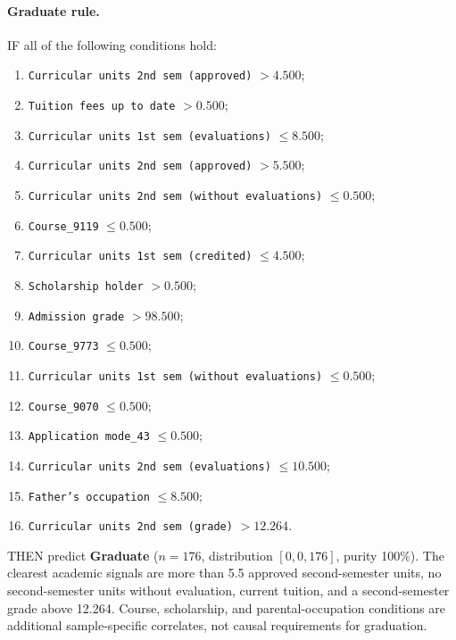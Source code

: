 \paragraph{Graduate rule.}
IF all of the following conditions hold:
\begin{enumerate}
  \small
  \setlength{\itemsep}{0.1em}
  \item \texttt{Curricular units 2nd sem (approved)} $> 4.500$;
  \item \texttt{Tuition fees up to date} $> 0.500$;
  \item \texttt{Curricular units 1st sem (evaluations)} $\leq 8.500$;
  \item \texttt{Curricular units 2nd sem (approved)} $> 5.500$;
  \item \texttt{Curricular units 2nd sem (without evaluations)} $\leq 0.500$;
  \item \texttt{Course\_9119} $\leq 0.500$;
  \item \texttt{Curricular units 1st sem (credited)} $\leq 4.500$;
  \item \texttt{Scholarship holder} $> 0.500$;
  \item \texttt{Admission grade} $> 98.500$;
  \item \texttt{Course\_9773} $\leq 0.500$;
  \item \texttt{Curricular units 1st sem (without evaluations)} $\leq 0.500$;
  \item \texttt{Course\_9070} $\leq 0.500$;
  \item \texttt{Application mode\_43} $\leq 0.500$;
  \item \texttt{Curricular units 2nd sem (evaluations)} $\leq 10.500$;
  \item \texttt{Father's occupation} $\leq 8.500$;
  \item \texttt{Curricular units 2nd sem (grade)} $> 12.264$.
\end{enumerate}
THEN predict \textbf{Graduate} ($n=176$, distribution $[0,0,176]$, purity
100\%). The clearest academic signals are more than 5.5 approved
second-semester units, no second-semester units without evaluation, current
tuition, and a second-semester grade above 12.264. Course, scholarship, and
parental-occupation conditions are additional sample-specific correlates, not
causal requirements for graduation.

